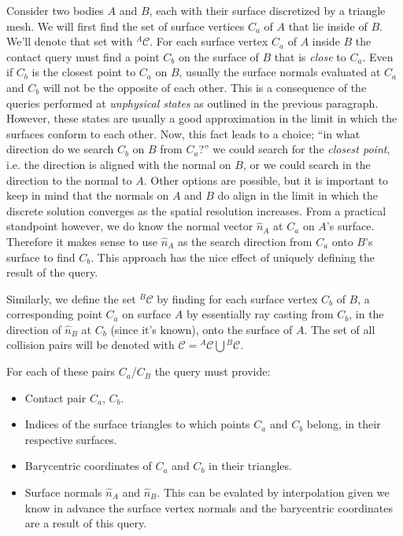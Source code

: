 \documentclass[a4paper]{article}
\begin{document}
Consider two bodies $A$ and $B$, each with their surface discretized by a
triangle mesh. We will first find the set of surface vertices $C_a$ of $A$ that
lie inside of $B$. We'll denote that set with ${}^A\mathcal{C}$. For each
surface vertex $C_a$ of $A$ inside $B$ the contact query must find a point $C_b$
on the surface of $B$ that is \textit{close} to $C_a$. Even if $C_b$ is the
closest point to $C_a$ on $B$, usually the surface normals evaluated at $C_a$
and $C_b$ will not be the opposite of each other. This is a consequence of the
queries performed at \textit{unphysical states} as outlined in the previous
paragraph. However, these states are usually a good approximation in the limit
in which the surfaces conform to each other. Now, this fact leads to a choice;
``in what direction do we search $C_b$ on $B$ from $C_a$?'' we could search for
the \textit{closest point}, i.e. the direction is aligned with the normal on
$B$, or we could search in the direction to the normal to $A$. Other options are
possible, but it is important to keep in mind that the normals on $A$ and $B$ do
align in the limit in which the discrete solution converges as the spatial
resolution increases. From a practical standpoint however, we do know the
normal vector $\widehat{n}_A$ at $C_a$ on $A$'s surface. Therefore it makes
sense to use $\widehat{n}_A$ as the search direction from $C_a$ onto $B$'s
surface to find $C_b$. This approach has the nice effect of uniquely defining
the result of the query.

Similarly, we define the set ${}^B\mathcal{C}$ by finding for each surface vertex
$C_b$ of $B$, a corresponding point $C_a$ on surface $A$ by essentially
ray casting from $C_b$, in the direction of $\widehat{n}_B$ at $C_b$ (since it's
known), onto the surface of $A$. The set of all collision pairs will be
denoted with $\mathcal{C} = {}^A\mathcal{C} \bigcup
{}^B\mathcal{C}$.
 
For each of these pairs $C_a$/$C_B$ the query must provide:
\begin{itemize}
\item Contact pair $C_a$, $C_b$.
\item Indices of the surface triangles to which points $C_a$ and $C_b$ belong,
in their respective surfaces.
\item Barycentric coordinates of $C_a$ and $C_b$ in their triangles.
\item Surface normals $\widehat{n}_A$ and $\widehat{n}_B$. This can be evalated
by interpolation given we know in advance the surface vertex normals and the
barycentric coordinates are a result of this query.
\end{itemize}
\end{document}
